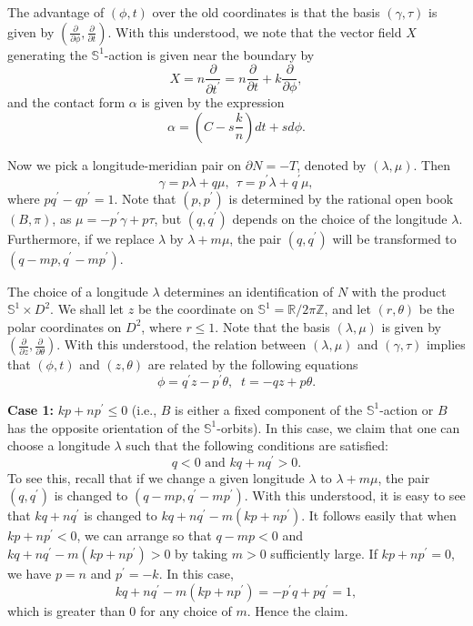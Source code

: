 \documentclass[11pt]{amsart}
\theoremstyle{plain}
\numberwithin{theorem}{section}
\theoremstyle{definition}
\newcommand{\R}{{\mathbb R}}
\newcommand{\Z}{{\mathbb Z}}
\newcommand{\s}{{\mathbb S}}
\begin{document}
The advantage of $(\phi,t)$ over the old coordinates is that the basis $(\gamma,\tau)$ is given by
$(\frac{\partial}{\partial\phi}, \frac{\partial}{\partial t})$. With this understood, we note that the vector field $X$ generating the $\s^1$-action is given near the boundary by
$$
X=n\frac{\partial}{\partial t^\prime}=n\frac{\partial}{\partial t}+k\frac{\partial}{\partial\phi},
$$
and the contact form $\alpha$ is given by the expression 
$$
\alpha=(C-s\frac{k}{n})dt+sd\phi.
$$

Now we pick a longitude-meridian pair on $\partial N=-T$, denoted by $(\lambda,\mu)$. Then 
$$
\gamma=p\lambda+q\mu,\;\, \tau=p^\prime\lambda+q^\prime\mu, 
$$
where $pq^\prime-qp^\prime=1$. Note that $(p,p^\prime)$ is determined by the rational open book 
$(B,\pi)$, as $\mu=-p^\prime\gamma+p\tau$, but $(q,q^\prime)$ depends on the choice of the longitude 
$\lambda$. Furthermore, if we replace $\lambda$ by $\lambda+m\mu$, the pair $(q,q^\prime)$ 
will be transformed to $(q-mp,q^\prime-mp^\prime)$. 

The choice of a longitude $\lambda$ determines an identification of $N$ with the product 
$\s^1\times D^2$. We shall let $z$ be the coordinate on $\s^1=\R/2\pi\Z$, and let $(r,\theta)$ be the polar coordinates on $D^2$, where $r\leq 1$. Note that the basis $(\lambda,\mu)$ is given by 
$(\frac{\partial}{\partial z}, \frac{\partial}{\partial \theta})$. With this understood, the relation between
$(\lambda,\mu)$ and $(\gamma,\tau)$ implies that $(\phi,t)$ and $(z,\theta)$ are related by the
following equations
$$
\phi=q^\prime z-p^\prime \theta,\;\; t=-qz+p\theta.
$$

{\bf Case 1:} $kp+np^\prime \leq 0$ (i.e., $B$ is either a fixed component of the $\s^1$-action or $B$ has the opposite orientation of the $\s^1$-orbits). In this case, we claim that one can choose a longitude $\lambda$ such that the following conditions are satisfied:
$$
q<0 \mbox{ and } kq+nq^\prime>0.
$$
To see this, recall that if we change a given longitude $\lambda$ to $\lambda+m\mu$, the pair
$(q,q^\prime)$ is changed to $(q-mp,q^\prime-mp^\prime)$. With this understood, it is easy to see that $kq+nq^\prime$ is changed to $kq+nq^\prime-m(kp+np^\prime)$. It follows easily that when 
$kp+np^\prime<0$, we can arrange so that $q-mp<0$ and $kq+nq^\prime-m(kp+np^\prime)>0$
by taking $m>0$ sufficiently large. If $kp+np^\prime=0$, we have $p=n$ and $p^\prime=-k$. In this case, 
$$
kq+nq^\prime-m(kp+np^\prime)=-p^\prime q+pq^\prime=1,
$$
which is greater than $0$ for any choice of $m$. Hence the claim.
\end{document}
